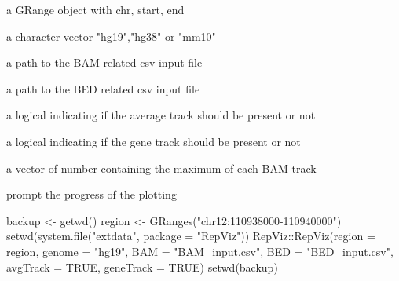 \documentclass[a4paper]{book}
\begin{document}
%
\begin{Arguments}
\begin{ldescription}
\item[\code{region}] a GRange object with chr, start, end

\item[\code{genome}] a character vector "hg19","hg38" or "mm10"

\item[\code{BAM}] a path to the BAM related csv input file

\item[\code{BED}] a path to the BED related csv input file

\item[\code{avgTrack}] a logical indicating if the average track should be present or not

\item[\code{geneTrack}] a logical indicating if the gene track should be present or not

\item[\code{max}] a vector of number containing the maximum of each BAM track

\item[\code{verbose}] prompt the progress of the plotting
\end{ldescription}
\end{Arguments}
%
\begin{Examples}
\begin{ExampleCode}
backup <- getwd()
region <- GRanges("chr12:110938000-110940000")
setwd(system.file("extdata", package = "RepViz"))
RepViz::RepViz(region = region,
               genome = "hg19",
               BAM = "BAM_input.csv",
               BED = "BED_input.csv",
               avgTrack = TRUE,
               geneTrack = TRUE)
setwd(backup)

\end{ExampleCode}
\end{Examples}
\printindex{}
\end{document}
